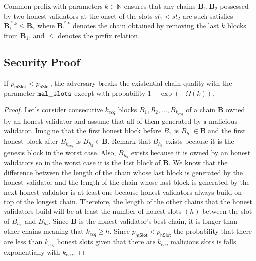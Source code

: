 \begin{definition} \label{def:cp}
	Common prefix with parameters $k \in \mathbb{N}$ ensures that any chains $\mathbf{B}_1, \mathbf{B}_2$ possessed by two honest validators at the onset of the slots $sl_1 < sl_2$ are such satisfies $\mathbf{B}_1^{\ulcorner k} \leq \mathbf{B}_2$ where  $\mathbf{B}_1^{\ulcorner k}$ denotes the chain obtained by removing the last $k$ blocks from $\mathbf{B}_1$, and $\leq$ denotes the prefix relation.
\end{definition}

\subsection{Security Proof}

\begin{lemma}[ECQ]\label{lem:ecq}
	If $ p_{\mathsf{mSlot}} < p_{\mathsf{hSlot}} $, the adversary breaks the existential chain quality with the parameter $ \mathtt{mal\_slots} $ except with probability $ 1- \exp(-\Omega(k)) $.
\end{lemma}

\begin{proof}
	
	Let's consider consecutive $ k_{ecq} $ blocks $ B_1, B_2, ..., B_{k_{ecq}} $ of a chain $ \mathbf{B} $ owned by an honest validator  and assume that all of them generated by a malicious validator. Imagine that the first honest block before $ B_1 $ is $ B_{h_1}  \in \mathbf{B}$  and the first honest block after $ B_{k_{ecq}} $ is $ B_{h_2}  \in \mathbf{B}$. Remark that $ B_{h_1} $ exists because it is the genesis block in the worst case. Also, $ B_{h_2} $ exists because it is owned by an honest validators so in the worst case it is the last block of $ \mathbf{B} $. We know that the difference between the length of the chain whose last block is generated by the honest validator and the length of the chain whose last block is generated by the next honest validator is at least one because honest validators always build on top of the longest chain. Therefore, the length of the other chains that the honest validators build will be at least the number of honest slots $ (h) $ between the slot of $ B_{h_1} $ and $ B_{h_2} $. Since $ \mathbf{B} $ is the honest validator's best chain, it is longer than other chains meaning that $ k_{ecq} \geq h $.  Since $ p_{\mathsf{mSlot}} < p_{\mathsf{hSlot}} $ the probability that there are less than $ k_{ecq} $ honest slots given that there are $ k_{ecq} $ malicious slots is  falls exponentially with $ k_{ecq} $.
\end{proof}


